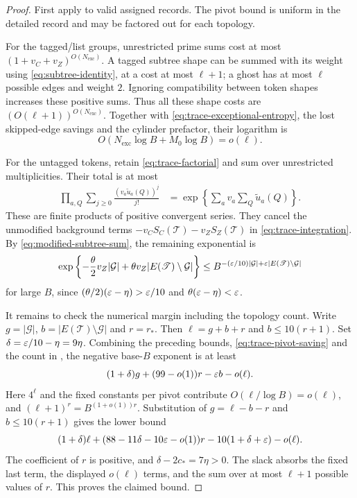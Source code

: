 \begin{proof}
First apply  to valid
assigned records.  The pivot bound is uniform in the detailed record
and may be factored out for each topology.

For the tagged/list groups, unrestricted prime sums cost at most
$(1+v_C+v_Z)^{O(N_{\mathrm{exc}})}$.  A tagged subtree shape can be
summed with its weight using \eqref{eq:subtree-identity}, at a cost
at most $\ell+1$; a ghost has at most $\ell$ possible edges and weight
$2$.  Ignoring compatibility between token shapes increases these
positive sums.  Thus all these shape costs are
$(O(\ell+1))^{O(N_{\mathrm{exc}})}$.  Together with
\eqref{eq:trace-exceptional-entropy}, the lost skipped-edge savings
and the cylinder prefactor, their logarithm is
\begin{equation}\label{eq:trace-small-costs}
 O(N_{\mathrm{exc}}\log B+M_0\log B)=o(\ell).
\end{equation}

For the untagged tokens, retain \eqref{eq:trace-factorial} and sum
over unrestricted multiplicities.  Their total is at most
\begin{align*}
 \prod_{a,Q}\sum_{j\ge0}
       \frac{(v_a\widetilde u_a(Q))^j}{j!}
 &=\exp\left\{\sum_a v_a\sum_Q\widetilde u_a(Q)\right\}.
\end{align*}
These are finite products of positive convergent series.  They cancel
the unmodified background terms
$-v_CS_C(\mathscr T)-v_ZS_Z(\mathscr T)$ in
\eqref{eq:trace-integration}.  By
\eqref{eq:modified-subtree-sum}, the remaining exponential is
\[
 \exp\left\{-\frac\theta2v_Z|\mathcal G|
              +\theta v_Z|E(\mathscr T)\setminus\mathcal G|\right\}
 \le B^{-(\varepsilon/10)|\mathcal G|
                +\varepsilon|E(\mathscr T)\setminus\mathcal G|}
\]
for large $B$, since
$(\theta/2)(\varepsilon-\eta)>\varepsilon/10$ and
$\theta(\varepsilon-\eta)<\varepsilon$.

It remains to check the numerical margin including the topology count.
Write $g=|\mathcal G|$, $b=|E(\mathscr T)\setminus\mathcal G|$ and
$r=r_*$.  Then $\ell=g+b+r$ and $b\le10(r+1)$.
Set $\delta=\varepsilon/10-\eta=9\eta$.  Combining the preceding bounds,
\eqref{eq:trace-pivot-saving} and the count in
, the negative base-$B$ exponent is at least
\[
 (1+\delta)g+(99-o(1))r-\varepsilon b-o(\ell).
\]
Here $4^\ell$ and the fixed constants per pivot contribute
$O(\ell/\log B)=o(\ell)$, and
$(\ell+1)^r=B^{(1+o(1))r}$.  Substitution of $g=\ell-b-r$ and
$b\le10(r+1)$ gives the lower bound
\[
 (1+\delta)\ell
 +(88-11\delta-10\varepsilon-o(1))r
 -10(1+\delta+\varepsilon)-o(\ell).
\]
The coefficient of $r$ is positive, and
$\delta-2c_*=7\eta>0$.  The slack absorbs the fixed last term, the
displayed $o(\ell)$ terms, and the sum over at most $\ell+1$ possible
values of $r$.  This proves the claimed bound.
\end{proof}

